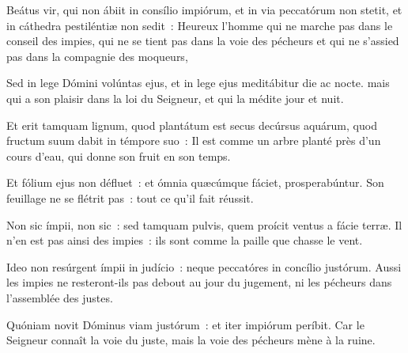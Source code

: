 
\begin{paracol}{2}

\LigneParacol{0cm}
{Beátus vir, qui non ábiit in consílio impiórum, et in via peccatórum non stetit, \GreStar{} et in cáthedra pestiléntiæ non sedit~:}
{Heureux l'homme qui ne marche pas dans le conseil des impies, qui ne se tient pas dans la voie des pécheurs et qui ne s'assied pas dans la compagnie des moqueurs, }

\LigneParacol{0.2cm}
{Sed in lege Dómini volúntas ejus, \GreStar{} et in lege ejus meditábitur die ac nocte.}
{mais qui a son plaisir dans la loi du Seigneur, et qui la médite jour et nuit. }

\LigneParacol{0.2cm}
{Et erit tamquam lignum, quod plantátum est secus decúrsus aquárum, \GreStar{} quod fructum suum dabit in témpore suo~:}
{Il est comme un arbre planté près d'un cours d'eau, qui donne son fruit en son temps.}

\LigneParacol{0.2cm}
{Et fólium ejus non défluet~: \GreStar{} et ómnia quæcúmque fáciet, prosperabúntur.}
{Son feuillage ne se flétrit pas~: tout ce qu'il fait réussit. }

\LigneParacol{0.2cm}
{Non sic ímpii, non sic~: \GreStar{} sed tamquam pulvis, quem proícit ventus a fácie terræ.}
{Il n'en est pas ainsi des impies~: ils sont comme la paille que chasse le vent. }

\LigneParacol{0.2cm}
{Ideo non resúrgent ímpii in judício~: \GreStar{} neque peccatóres in concílio justórum.}
{Aussi les impies ne resteront-ils pas debout au jour du jugement, ni les pécheurs dans l'assemblée des justes. }

\LigneParacol{0.2cm}
{Quóniam novit Dóminus viam justórum~: \GreStar{} et iter impiórum períbit.}
{Car le Seigneur connaît la voie du juste, mais la voie des pécheurs mène à la ruine. }

\end{paracol}
\Gloria
{}
